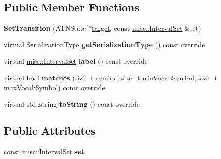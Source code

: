 \subsection*{Public Member Functions}
\begin{DoxyCompactItemize}
\item 
\mbox{\label{classantlr4_1_1atn_1_1SetTransition_ac6475468b5391a72b44151e70a35be13}} 
{\bfseries Set\+Transition} (A\+T\+N\+State $\ast$\hyperlink{classantlr4_1_1atn_1_1Transition_aaaed7f4ddda71e156b36de33e88f66a7}{target}, const \hyperlink{classantlr4_1_1misc_1_1IntervalSet}{misc\+::\+Interval\+Set} \&set)
\item 
\mbox{\label{classantlr4_1_1atn_1_1SetTransition_aaa9929d41cd9b0bcc5da0b765caeed9c}} 
virtual Serialization\+Type {\bfseries get\+Serialization\+Type} () const override
\item 
\mbox{\label{classantlr4_1_1atn_1_1SetTransition_aac8d5ecadfd7f52d7030dc8fd4dadc2f}} 
virtual \hyperlink{classantlr4_1_1misc_1_1IntervalSet}{misc\+::\+Interval\+Set} {\bfseries label} () const override
\item 
\mbox{\label{classantlr4_1_1atn_1_1SetTransition_a1f0ff223f77d8c0b0c352ebc7c326540}} 
virtual bool {\bfseries matches} (size\+\_\+t symbol, size\+\_\+t min\+Vocab\+Symbol, size\+\_\+t max\+Vocab\+Symbol) const override
\item 
\mbox{\label{classantlr4_1_1atn_1_1SetTransition_a54984b348b26fec851a8a4360b69eb03}} 
virtual std\+::string {\bfseries to\+String} () const override
\end{DoxyCompactItemize}
\subsection*{Public Attributes}
\begin{DoxyCompactItemize}
\item 
\mbox{\label{classantlr4_1_1atn_1_1SetTransition_acab185db21bb0e76034526595150fd80}} 
const \hyperlink{classantlr4_1_1misc_1_1IntervalSet}{misc\+::\+Interval\+Set} {\bfseries set}
\end{DoxyCompactItemize}
